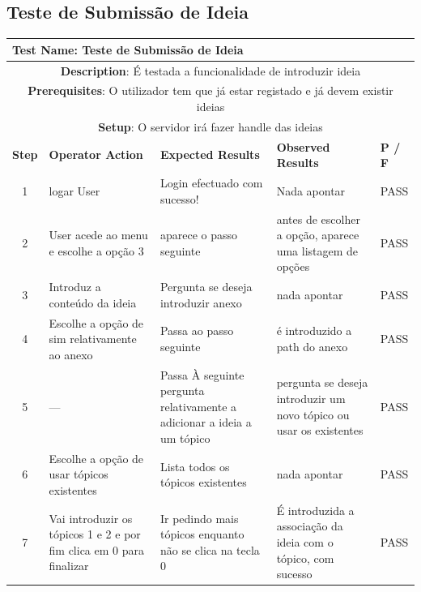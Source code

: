 \documentclass[12pt]{article} %
\begin{document}
\subsection{Teste de Submissão de Ideia}
\begin{table}[ht!]
	\begin{tabular}{|c|p{4cm}|p{4cm}|p{3cm}|p{1cm}|}
		\hline
		\multicolumn{5}{|l|}{\textbf{Test Name}: Teste de Submissão de Ideia}\\
		\hline
		\multicolumn{5}{|p{14,5cm}|}{\textbf{Description}: É testada a funcionalidade de introduzir ideia}\\
		\hline
		\multicolumn{5}{|p{14,5cm}|}{\textbf{Prerequisites}: O utilizador tem que já estar registado e já devem existir ideias}\\
		\hline
		\multicolumn{5}{|p{14,5cm}|}{\textbf{Setup}: O servidor irá fazer handle das ideias}\\
		\hline
		\textbf{Step} & \textbf{Operator Action} & \textbf{Expected Results} & \textbf{Observed Results} & \textbf{P / F}\\
		\hline
		1 & logar User & Login efectuado com sucesso! & Nada apontar & PASS\\
		\hline
		2 & User acede ao menu e escolhe a opção 3 & aparece o passo seguinte & antes de escolher a opção, aparece uma listagem de opções & PASS\\
		\hline
		3 & Introduz a conteúdo da ideia & Pergunta se deseja introduzir anexo & nada apontar & PASS\\
		\hline
		4 & Escolhe a opção de sim relativamente ao anexo & Passa ao passo seguinte & é introduzido a path do anexo & PASS\\
		\hline
		5 & --- & Passa À seguinte pergunta relativamente a adicionar a ideia a um tópico & pergunta se deseja introduzir um novo tópico ou usar os existentes & PASS\\
		\hline
		6 & Escolhe a opção de usar tópicos existentes & Lista todos os tópicos existentes & nada apontar & PASS\\
		\hline
		7 & Vai introduzir os tópicos 1 e 2 e por fim clica em 0 para finalizar & Ir pedindo mais tópicos enquanto não se clica na tecla 0 & É introduzida a associação da ideia com o tópico, com sucesso & PASS\\
		\hline
	\end{tabular}
\end{table}
\pagebreak



\end{document}
